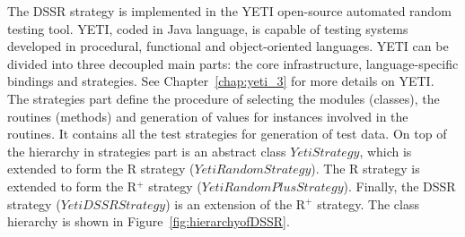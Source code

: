 The DSSR strategy is implemented in the YETI open-source automated random testing tool. YETI, coded in Java language, is capable of testing systems developed in procedural, functional and object-oriented languages.
YETI can be divided into three decoupled main parts: the core infrastructure, language-specific bindings and strategies. See Chapter~\ref{chap:yeti_3} for more details on YETI. 
The strategies part define the procedure of selecting the modules (classes), the routines (methods) and generation of values for instances involved in the routines. It contains all the test strategies for generation of test data. On top of the hierarchy in strategies part is an abstract class $YetiStrategy$, which is extended to form the R strategy ($YetiRandomStrategy$). The R strategy is extended to form the R$^+$ strategy ($YetiRandomPlusStrategy$). Finally, the DSSR strategy ($YetiDSSRStrategy$) is an extension of the R$^+$ strategy. The class hierarchy is shown in Figure~\ref{fig:hierarchyofDSSR}.


